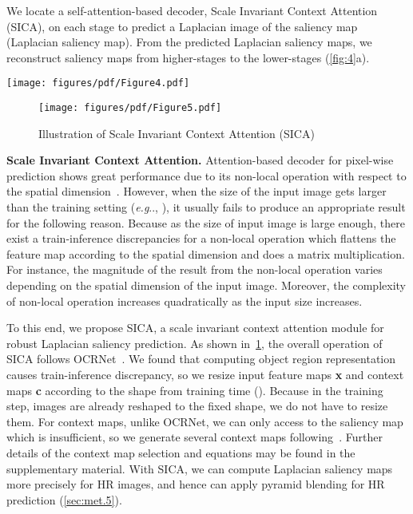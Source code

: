 \documentclass{llncs}
\makeatletter
\DeclareRobustCommand\onedot{\futurelet\@let@token\@onedot}
\def\@onedot{\ifx\@let@token.\else.\null\fi\xspace}
\def\eg{\emph{e.g}\onedot} \def\Eg{\emph{E.g}\onedot}
\makeatother
\begin{document}
        We locate a self-attention-based decoder, Scale Invariant Context Attention (SICA), on each stage to predict a Laplacian image of the saliency map (Laplacian saliency map). 
        From the predicted Laplacian saliency maps, we reconstruct saliency maps from higher-stages to the lower-stages (\cref{fig:4}a).
        \begin{figure*}[t]
    \centering
    \texttt{[image: figures/pdf/Figure4.pdf]} 
    \caption{The architecture of proposed InSPyReNet. 
            (a) The initial saliency map from \texttt{Stage-3} and Laplacian saliency maps from higher-stages are combined with EXPAND operation to be reconstructed to the original input size. 
            (b) The ground-truth is deconstructed to the smaller stages for predicted saliency maps from each stage by REDUCE operation.}
    \label{fig:4}
\end{figure*}         \begin{figure}
    \centering
    \texttt{[image: figures/pdf/Figure5.pdf]}
    \caption{Illustration of Scale Invariant Context Attention (SICA)}
    \label{fig:5}
\end{figure} 
        \noindent
        \textbf{Scale Invariant Context Attention.}
        \label{sec:met.2}
        Attention-based decoder for pixel-wise prediction shows great performance due to its non-local operation with respect to the spatial dimension~\cite{fu2019dual, yuan2020object}. 
        However, when the size of the input image gets larger than the training setting (\eg, ), it usually fails to produce an appropriate result for the following reason.
        Because as the size of input image is large enough, there exist a train-inference discrepancies for a non-local operation which flattens the feature map according to the spatial dimension and does a matrix multiplication.
        For instance, the magnitude of the result from the non-local operation varies depending on the spatial dimension of the input image.
        Moreover, the complexity of non-local operation increases quadratically as the input size increases. 

        To this end, we propose SICA, a scale invariant context attention module for robust Laplacian saliency prediction. 
        As shown in~\cref{fig:5}, the overall operation of SICA follows OCRNet~\cite{yuan2020object}. 
        We found that computing object region representation causes train-inference discrepancy, so we resize input feature maps \textbf{x} and context maps \textbf{c} according to the shape from training time (). 
        Because in the training step, images are already reshaped to the fixed shape, we do not have to resize them. 
        For context maps, unlike OCRNet, we can only access to the saliency map which is insufficient, so we generate several context maps following~\cite{kim2021uacanet}. 
        Further details of the context map selection and equations may be found in the supplementary material.
        With SICA, we can compute Laplacian saliency maps more precisely for HR images, and hence can apply pyramid blending for HR prediction (\cref{sec:met.5}).
\end{document}

